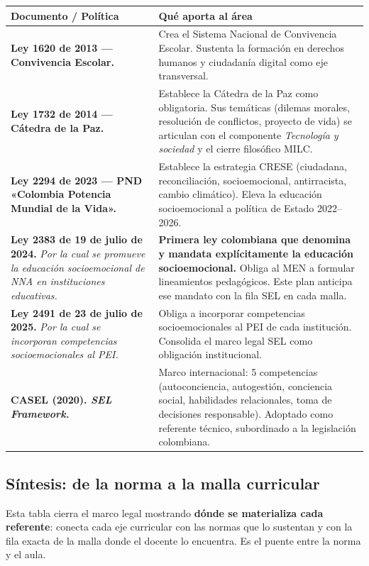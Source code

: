 \documentclass[12pt, a4paper]{article}
\begin{document}
\begin{longtable}{|L{6.5cm}|L{7.5cm}|}
\hline
{}
\color{white}\textbf{Documento / Política} &
\color{white}\textbf{Qué aporta al área} \\
\hline
\endhead
\textbf{Ley 1620 de 2013 — Convivencia Escolar.} &
Crea el Sistema Nacional de Convivencia Escolar. Sustenta la formación
en derechos humanos y ciudadanía digital como eje transversal. \\
\hline
\textbf{Ley 1732 de 2014 — Cátedra de la Paz.} &
Establece la Cátedra de la Paz como obligatoria. Sus temáticas
(dilemas morales, resolución de conflictos, proyecto de vida)
se articulan con el componente \textit{Tecnología y sociedad} y
el cierre filosófico MILC. \\
\hline
\textbf{Ley 2294 de 2023 — PND «Colombia Potencia Mundial de la Vida».} &
Establece la estrategia CRESE (ciudadana, reconciliación, socioemocional,
antirracista, cambio climático). Eleva la educación socioemocional a
política de Estado 2022–2026. \\
\hline
\textbf{Ley 2383 de 19 de julio de 2024.} \textit{Por la cual se promueve
la educación socioemocional de NNA en instituciones educativas.} &
\textbf{Primera ley colombiana que denomina y mandata explícitamente
la educación socioemocional.} Obliga al MEN a formular lineamientos
pedagógicos. Este plan anticipa ese mandato con la fila SEL en cada malla. \\
\hline
\textbf{Ley 2491 de 23 de julio de 2025.} \textit{Por la cual se incorporan
competencias socioemocionales al PEI.} &
Obliga a incorporar competencias socioemocionales al PEI de cada institución.
Consolida el marco legal SEL como obligación institucional. \\
\hline
\textbf{CASEL (2020). \textit{SEL Framework.}} &
Marco internacional: 5 competencias (autoconciencia, autogestión,
conciencia social, habilidades relacionales, toma de decisiones responsable).
Adoptado como referente técnico, subordinado a la legislación colombiana. \\
\hline
\end{longtable}

\subsection{Síntesis: de la norma a la malla curricular}

Esta tabla cierra el marco legal mostrando \textbf{dónde se materializa cada
referente}: conecta cada eje curricular con las normas que lo sustentan y con la
fila exacta de la malla donde el docente lo encuentra. Es el puente entre la
norma y el aula.
\end{document}
